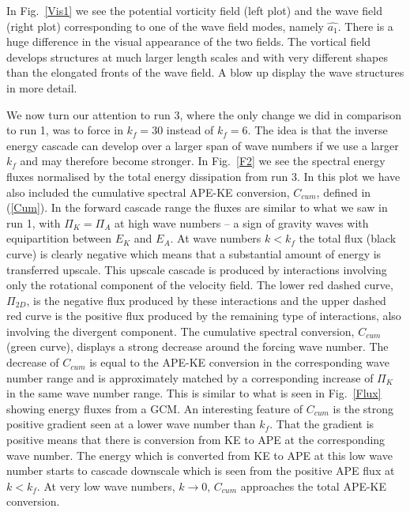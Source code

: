 In Fig.~\ref{Vis1} we see the potential vorticity field (left plot) and the wave field (right plot) corresponding to one of the wave field modes, namely $ \widehat{a_1} $. There is a huge difference in the visual appearance of the two fields. The vortical field develops structures at much larger length scales and with very different shapes than the elongated fronts of the wave field. A blow up display the wave structures in more detail.



We now turn our attention to run 3, where the only change we did in comparison to run 1, was to force in $ k_f = 30 $ instead of $ k_f = 6 $. The idea is that the inverse energy cascade can develop over a larger span of wave numbers if we use a larger $ k_f $ and may therefore become stronger.  In Fig.~\ref{F2} we see the spectral energy fluxes normalised by the total energy dissipation from run 3.  In this plot we have also included the cumulative spectral APE-KE conversion, $ C_{cum} $,  defined in (\ref{Cum}). In the forward  cascade range the fluxes are similar to what we saw in run 1, with $ \Pi_K = \Pi_A $ at high wave numbers --  a sign of gravity waves with equipartition between $ E_K $ and $ E_A $. At wave numbers $ k < k_f $ the total flux (black curve) is clearly negative which means that a substantial amount of energy is transferred upscale. This upscale cascade
 is produced by interactions involving only the rotational component  of the velocity field. The lower red dashed curve, $ \Pi_{2D} $, is the negative flux produced by these interactions and the upper dashed red curve is the positive flux produced by the remaining type of interactions, also involving the divergent component.  The cumulative spectral conversion, $ C_{cum} $ (green curve), displays a strong decrease around the forcing wave number. The decrease of $ C_{cum} $ is equal to the APE-KE conversion in the corresponding wave number range and is approximately matched by a corresponding increase of $ \Pi_K $ in the same wave number range. This is similar to what is seen in Fig.~\ref{Flux} showing energy fluxes from a GCM. An interesting feature of $ C_{cum} $ is the strong positive gradient seen at a lower wave number than $ k_f $. That the gradient is positive means that there is conversion from KE to APE at the corresponding wave number. The energy which is converted  from KE to APE at this low wave number starts to cascade downscale which is seen from the positive APE flux at  $ k < k_f $.  At very low wave numbers, $ k \rightarrow 0 $, $ C_{cum} $ approaches the total APE-KE conversion.



